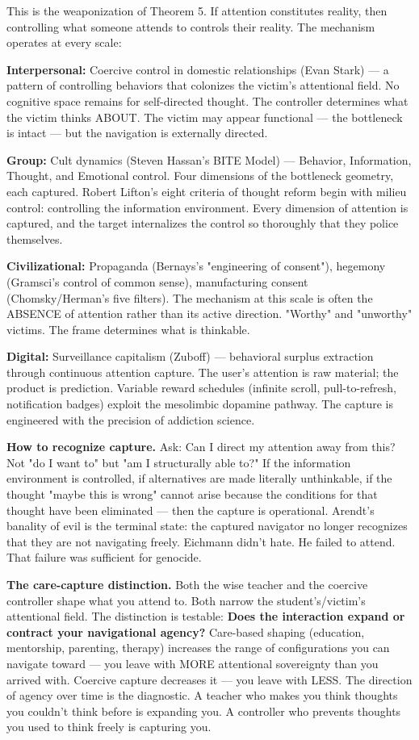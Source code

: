 This is the weaponization of Theorem 5. If attention constitutes reality, then controlling what someone attends to controls their reality. The mechanism operates at every scale:


\textbf{Interpersonal:} Coercive control in domestic relationships (Evan Stark) — a pattern of controlling behaviors that colonizes the victim's attentional field. No cognitive space remains for self-directed thought. The controller determines what the victim thinks ABOUT. The victim may appear functional — the bottleneck is intact — but the navigation is externally directed.


\textbf{Group:} Cult dynamics (Steven Hassan's BITE Model) — Behavior, Information, Thought, and Emotional control. Four dimensions of the bottleneck geometry, each captured. Robert Lifton's eight criteria of thought reform begin with milieu control: controlling the information environment. Every dimension of attention is captured, and the target internalizes the control so thoroughly that they police themselves.


\textbf{Civilizational:} Propaganda (Bernays's "engineering of consent"), hegemony (Gramsci's control of common sense), manufacturing consent (Chomsky/Herman's five filters). The mechanism at this scale is often the ABSENCE of attention rather than its active direction. "Worthy" and "unworthy" victims. The frame determines what is thinkable.


\textbf{Digital:} Surveillance capitalism (Zuboff) — behavioral surplus extraction through continuous attention capture. The user's attention is raw material; the product is prediction. Variable reward schedules (infinite scroll, pull-to-refresh, notification badges) exploit the mesolimbic dopamine pathway. The capture is engineered with the precision of addiction science.


\textbf{How to recognize capture.} Ask: Can I direct my attention away from this? Not "do I want to" but "am I structurally able to?" If the information environment is controlled, if alternatives are made literally unthinkable, if the thought "maybe this is wrong" cannot arise because the conditions for that thought have been eliminated — then the capture is operational. Arendt's banality of evil is the terminal state: the captured navigator no longer recognizes that they are not navigating freely. Eichmann didn't hate. He failed to attend. That failure was sufficient for genocide.


\textbf{The care-capture distinction.} Both the wise teacher and the coercive controller shape what you attend to. Both narrow the student's/victim's attentional field. The distinction is testable: \textbf{Does the interaction expand or contract your navigational agency?} Care-based shaping (education, mentorship, parenting, therapy) increases the range of configurations you can navigate toward — you leave with MORE attentional sovereignty than you arrived with. Coercive capture decreases it — you leave with LESS. The direction of agency over time is the diagnostic. A teacher who makes you think thoughts you couldn't think before is expanding you. A controller who prevents thoughts you used to think freely is capturing you.


